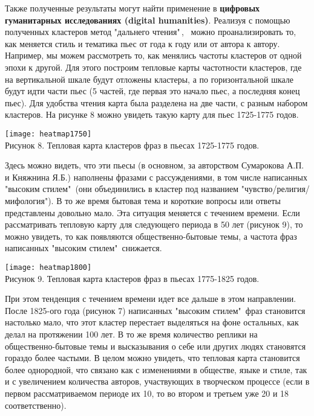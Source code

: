 \documentclass[a4paper,14pt]{article}
\begin{document}
\begin{justify}
\indent
Также полученные результаты могут найти применение в \textbf{цифровых гуманитарных исследованиях (digital humanities)}. Реализуя с помощью полученных кластеров метод "дальнего чтения"\,, \ можно проанализировать то, как меняется стиль и тематика пьес от года к году или от автора к автору. \\
\indent
Например, мы можем рассмотреть то, как менялись частоты кластеров от одной эпохи к другой. Для этого построим тепловые карты частотности кластеров, где на вертикальной шкале будут отложены кластеры, а по горизонтальной шкале будут идти части пьес (5 частей, где первая это начало пьес, а последняя конец пьес). Для удобства чтения карта была разделена на две части, с разным набором кластеров. На рисунке 8 можно увидеть такую карту для пьес 1725-1775 годов.
\begin{center}
	\texttt{[image: heatmap1750]} \\
	Рисунок 8. Тепловая карта кластеров фраз в пьесах 1725-1775 годов.
\end{center}
\indent
Здесь можно видеть, что эти пьесы (в основном, за авторством Сумарокова А.П. и Княжнина Я.Б.) наполнены фразами с рассуждениями, в том числе написанных "высоким стилем"\ (они объединились в кластер под названием "чувство/религия/мифология"). В то же время бытовая тема и короткие вопросы или ответы представлены довольно мало. Эта ситуация меняется с течением времени. Если рассматривать тепловую карту для следующего периода в 50 лет (рисунок 9), то можно увидеть, то как появляются общественно-бытовые темы, а частота фраз написанных "высоким стилем"\ снижается.
\begin{center}
	\texttt{[image: heatmap1800]} \\
	Рисунок 9. Тепловая карта кластеров фраз в пьесах 1775-1825 годов.
\end{center}
При этом тенденция с течением времени идет все дальше в этом направлении. После 1825-ого года (рисунок 7) написанных "высоким стилем"\ фраз становится настолько мало, что этот кластер перестает выделяться на фоне остальных, как делал на протяжении 100 лет. В то же время количество реплики на общественно-бытовые темы и высказывания о себе или других людях становятся гораздо более частыми. В целом можно увидеть, что тепловая карта становится более однородной, что связано как с изменениями в обществе, языке и стиле, так и с увеличением количества авторов, участвующих в творческом процессе (если в первом рассматриваемом периоде их 10, то во втором и третьем уже 20 и 18 соответственно).
\begin{center}

\end{center}
\end{justify}
\end{document}

